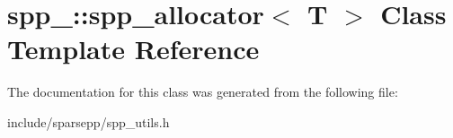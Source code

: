\hypertarget{classspp___1_1spp__allocator}{}\section{spp\+\_\+\+:\+:spp\+\_\+allocator$<$ T $>$ Class Template Reference}
\label{classspp___1_1spp__allocator}


The documentation for this class was generated from the following file\+:\begin{DoxyCompactItemize}
\item 
include/sparsepp/spp\+\_\+utils.\+h\end{DoxyCompactItemize}

